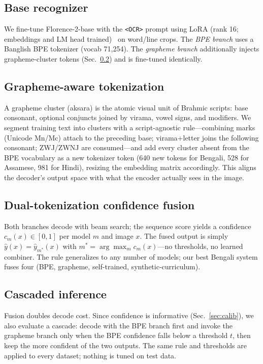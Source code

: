 \documentclass[iicol,pdflatex,sn-mathphys-num]{sn-jnl}
\begin{document}
\subsection{Base recognizer}
We fine-tune Florence-2-base with the \texttt{<OCR>} prompt using LoRA
(rank 16; embeddings and LM head trained)~\cite{lora} on word/line crops.
The \emph{BPE branch} uses a Banglish BPE tokenizer (vocab 71{,}254). The
\emph{grapheme branch} additionally injects grapheme-cluster tokens
(Sec.~\ref{sec:grapheme}) and is fine-tuned identically.

\subsection{Grapheme-aware tokenization}\label{sec:grapheme}
A grapheme cluster (aksara) is the atomic visual unit of Brahmic scripts:
base consonant, optional conjuncts joined by virama, vowel signs, and
modifiers. We segment training text into clusters with a script-agnostic
rule---combining marks (Unicode Mn/Mc) attach to the preceding base;
virama+letter joins the following consonant; ZWJ/ZWNJ are consumed---and
add every cluster absent from the BPE vocabulary as a new tokenizer token
(640 new tokens for Bengali, 528 for Assamese, 981 for Hindi), resizing
the embedding matrix accordingly. This aligns the decoder's output space
with what the encoder actually sees in the image.

\subsection{Dual-tokenization confidence fusion}\label{sec:fusion}
Both branches decode with beam search; the sequence score yields a
confidence $c_m(x)\in[0,1]$ per model $m$ and image $x$. The fused output is
simply $\hat{y}(x) = \hat{y}_{m^\ast}(x)$ with
$m^\ast=\arg\max_m c_m(x)$---no thresholds, no learned combiner. The rule
generalizes to any number of models; our best Bengali system fuses four
(BPE, grapheme, self-trained, synthetic-curriculum).

\subsection{Cascaded inference}\label{sec:cascademethod}
Fusion doubles decode cost. Since confidence is informative
(Sec.~\ref{sec:calib}), we also evaluate a cascade: decode with the BPE
branch first and invoke the grapheme branch only when the BPE confidence
falls below a threshold $t$, then keep the more confident of the two
outputs. The same rule and thresholds are applied to every dataset;
nothing is tuned on test data.
\end{document}
